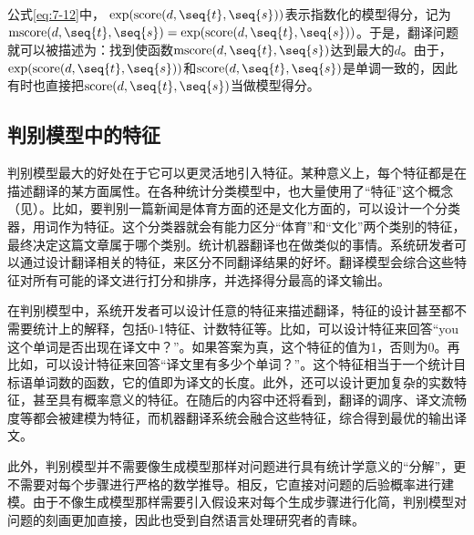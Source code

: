 \parinterval 公式\eqref{eq:7-12}中，$\ \textrm{exp}(\textrm{score}(d,\seq{t},\seq{s}))$表示指数化的模型得分，记为$\textrm{mscore}(d,\seq{t},\seq{s}) = \textrm{exp}(\textrm{score}(d,\seq{t},\seq{s}))$。于是，翻译问题就可以被描述为：找到使函数$\textrm{mscore}(d,\seq{t},\seq{s})$达到最大的$d$。由于，$\textrm{exp}(\textrm{score}(d,\seq{t},\seq{s}))$和$\textrm{score}(d,\seq{t},\seq{s})$是单调一致的，因此有时也直接把$\textrm{score}(d,\seq{t},\seq{s})$当做模型得分。


\subsection{判别模型中的特征}


\parinterval 判别模型最大的好处在于它可以更灵活地引入特征。某种意义上，每个特征都是在描述翻译的某方面属性。在各种统计分类模型中，也大量使用了“特征”这个概念（见{\chapterthree}）。比如，要判别一篇新闻是体育方面的还是文化方面的，可以设计一个分类器，用词作为特征。这个分类器就会有能力区分“体育”和“文化”两个类别的特征，最终决定这篇文章属于哪个类别。统计机器翻译也在做类似的事情。系统研发者可以通过设计翻译相关的特征，来区分不同翻译结果的好坏。翻译模型会综合这些特征对所有可能的译文进行打分和排序，并选择得分最高的译文输出。

\parinterval 在判别模型中，系统开发者可以设计任意的特征来描述翻译，特征的设计甚至都不需要统计上的解释，包括0-1特征、计数特征等。比如，可以设计特征来回答“you这个单词是否出现在译文中？”。如果答案为真，这个特征的值为1，否则为0。再比如，可以设计特征来回答“译文里有多少个单词？”。这个特征相当于一个统计目标语单词数的函数，它的值即为译文的长度。此外，还可以设计更加复杂的实数特征，甚至具有概率意义的特征。在随后的内容中还将看到，翻译的调序、译文流畅度等都会被建模为特征，而机器翻译系统会融合这些特征，综合得到最优的输出译文。

\parinterval 此外，判别模型并不需要像生成模型那样对问题进行具有统计学意义的“分解”，更不需要对每个步骤进行严格的数学推导。相反，它直接对问题的后验概率进行建模。由于不像生成模型那样需要引入假设来对每个生成步骤进行化简，判别模型对问题的刻画更加直接，因此也受到自然语言处理研究者的青睐。


